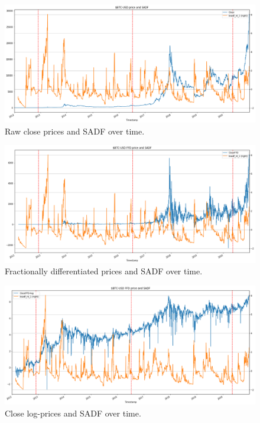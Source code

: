 \begin{figure}[H]
    \centering
    \includegraphics[width=\textwidth]{methods/images/sadf_prices.png}
    \caption{Raw close prices and SADF over time.}
    \label{fig:sadf_prices}
\end{figure}

\begin{figure}[H]
    \centering
    \includegraphics[width=\textwidth]{methods/images/sadf_prices_ffd.png}
    \caption{Fractionally differentiated prices and SADF over time.}
    \label{fig:sadf_prices_ffd}
\end{figure}

\begin{figure}[H]
    \centering
    \includegraphics[width=\textwidth]{methods/images/sadf_prices_log.png}
    \caption{Close log-prices and SADF over time.}
    \label{fig:sadf_prices_log}
\end{figure}

